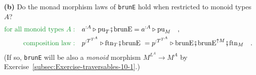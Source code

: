 \textbf{(b)} Do the monad morphism laws of \lstinline!brunE! hold
when restricted to monoid types $A$?
\begin{align*}
{\color{greenunder}\text{for all monoid types }A:}\quad & a^{:A}\triangleright\text{pu}_{T}\bef\text{brunE}=a^{:A}\triangleright\text{pu}_{M}\quad,\\
{\color{greenunder}\text{composition law}:}\quad & p^{:T^{T^{A}}}\triangleright\text{ftn}_{T}\bef\text{brunE }=p^{:T^{T^{A}}}\triangleright\text{brunE}\bef\text{brunE}^{\uparrow M}\bef\text{ftn}_{M}\quad.
\end{align*}
(If so, \lstinline!brunE! will be also a \emph{monoid} morphism $M^{L^{A}}\rightarrow M^{A}$
by Exercise~\ref{subsec:Exercise-traversables-10-1}.) %

